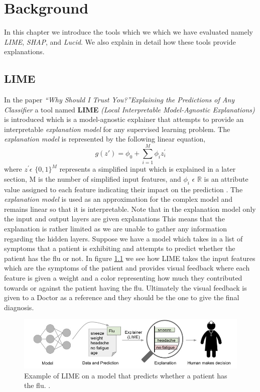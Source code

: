 
\chapter{Background} \label{sect-background}
In this chapter we introduce the  tools which we which we have evaluated namely \emph{LIME}, \emph{SHAP}, and \emph{Lucid}. We also explain in detail how these tools provide explanations.
\section{LIME}
In the paper \emph{“Why Should I Trust You?”Explaining the Predictions of Any Classifier} \cite{lime} a tool named \textbf{LIME} \emph{(Local Interpretable Model-Agnostic Explanations)} is introduced which is a model-agnostic explainer that attempts to provide an interpretable \emph{explanation model} for any supervised learning problem. The \emph{explanation model} is represented by the following linear equation,
\begin{equation}
g(z') = \phi_0 + \sum\limits_{i=1}^M \phi_i z_{i}^{'}
\label{eq:lime-explanation}
\end{equation}
where $z^{'} \epsilon$ $\{0,1\}^{M}$ represents a simplified input which is explained in a later section, M is the number of simplified input features, and $\phi_{i}$ $\epsilon$ $\mathbb{R}$ is an attribute value assigned to each feature indicating their impact on the prediction \cite{NIPS2017_7062}.
The \emph{explanation model} is used as an approximation for the complex model and remains linear so that it is interpretable. Note that in the explanation model only the input and output layers are given explanations This means that the explanation is rather limited as we are unable to gather any information regarding the hidden layers. Suppose we have a model which takes in a list of symptoms that a patient is exhibiting and attempts to predict whether the patient has the flu or not. In figure \ref{fig:lime-process} we see how LIME takes the input features which are the symptoms of the patient and provides visual feedback where each feature is given a weight and a color representing how much they contributed towards or against the patient having the flu. Ultimately the visual feedback is given to a Doctor as a reference and they should be the one to give the final diagnosis.




\begin  {figure} [!htbp]
  \includegraphics[width=\linewidth]{Evaluation_Images/Lime_Process.jpg}
  \caption{Example of LIME on a model that predicts whether a patient has the flu. \cite{lime}.}
  \label{fig:lime-process}
\end{figure}


